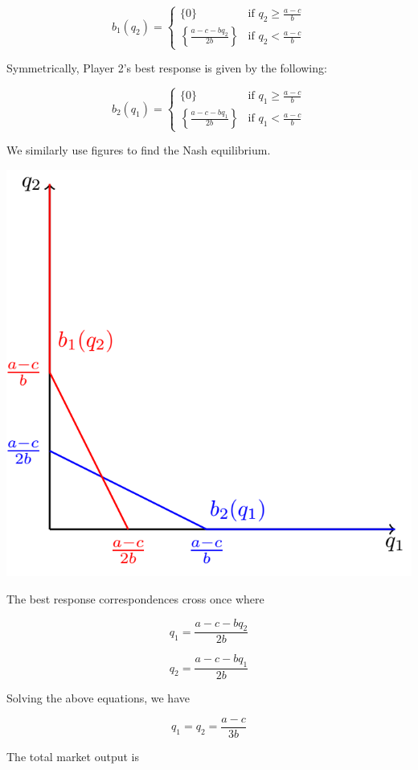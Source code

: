 \documentclass[12pt, oneside]{article}
\begin{document}
\[
b_1(q_2) =
\begin{cases}
    \{0\} & \text{if } q_2 \geq \frac{a - c}{b} \\
    \left\{ \frac{a - c - bq_2}{2b} \right\} & \text{if } q_2 < \frac{a - c}{b}
\end{cases}
\]

Symmetrically, Player 2’s best response is given by the following:

\[
b_2(q_1) =
\begin{cases}
    \{0\} & \text{if } q_1 \geq \frac{a - c}{b} \\
    \left\{ \frac{a - c - bq_1}{2b} \right\} & \text{if } q_1 < \frac{a - c}{b}
\end{cases}
\]

We similarly use figures to find the Nash equilibrium.
\begin{center}
\includegraphics{Figure/Cournet.jpg}
\end{center}
The best response correspondences cross once where

\[
q_1 = \frac{a - c - bq_2}{2b}
\]

\[
q_2 = \frac{a - c - bq_1}{2b}
\]

Solving the above equations, we have

\[
q_1 = q_2 = \frac{a - c}{3b}
\]

The total market output is
\end{document}
